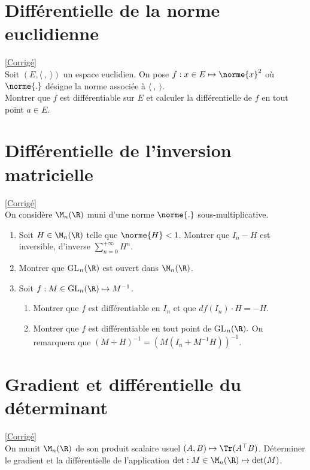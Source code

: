 \documentclass{book}
\begin{document}
\section{Différentielle de la norme euclidienne}
\label{Différentielle de la norme euclidienne}
\textcolor{blue}{\hyperref[sec:differentielle-de-la-norme-euclidienne]{[Corrigé]}}\\
Soit $(E,\langle\ ,\ \rangle)$ un espace euclidien. On pose $f:x\in E\mapsto\norme{x}^2$ où $\norme{.}$ désigne la norme associée à $\langle\ ,\ \rangle$.\\
Montrer que $f$ est différentiable sur $E$ et calculer la différentielle de $f$ en tout point $a\in E$.

\section{Différentielle de l'inversion matricielle}
\textcolor{blue}{\hyperref[sec:differentielle-de-linversion-matricielle]{[Corrigé]}}\\
\label{Différentielle de l'inversion matricielle}
On considère $\M_n(\R)$ muni d'une norme $\norme{.}$ sous-multiplicative.
\begin{enumerate}
	\item Soit $H\in\M_n(\R)$ telle que $\norme{H}<1$. Montrer que $I_n-H$ est inversible, d'inverse $\displaystyle\sum\limits_{n=0}^{+\infty}H^n$.
	\item Montrer que GL$_n(\R)$ est ouvert dans $\M_n(\R)$.
	\item Soit $f:M\in \text{GL}_n(\R)\mapsto M^{-1}$.
	\begin{enumerate}[label=\alph*.]
		\item Montrer que $f$ est différentiable en $I_n$ et que $df(I_n)\cdot H=-H$.
		\item Montrer que $f$ est différentiable en tout point de GL$_n(\R).$ On remarquera que $(M+H)^{-1}=(M(I_n+M^{-1}H))^{-1}$.
	\end{enumerate}
\end{enumerate}

\section{Gradient et différentielle du déterminant}
\label{Gradient et différentielle du déterminant}
\textcolor{blue}{\hyperref[sec:gradient-et-differentielle-du-determinant]{[Corrigé]}}\\
On munit $\M_n(\R)$ de son produit scalaire usuel $(A,B)\mapsto\Tr(A^\top B)$.
Déterminer le gradient et la différentielle de l'application $\det:M\in \M_n(\R)\mapsto\det(M)$.
\end{document}

